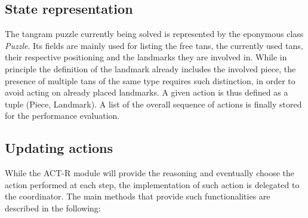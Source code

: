 \documentclass[a4paper,singleside,12pt]{report} %
\begin{document}
    \subsection{State representation}
    The tangram puzzle currently being solved is represented by the eponymous class \textit{Puzzle}.
    Its fields are mainly used for listing the free tans, the currently used tans, their respective
    positioning and the landmarks they are involved in. While in principle the definition of the
    landmark already includes the involved piece, the presence of multiple tans of the same type
    requires such distinction, in order to avoid acting on already placed landmarks. A given action
    is thus defined as a tuple (Piece, Landmark). A list of the overall sequence of actions is
    finally stored for the performance evaluation.
    \subsection{Updating actions}
    While the ACT-R module will provide the reasoning and eventually choose the action performed at
    each step, the implementation of such action is delegated to the coordinator. The main methods
    that provide such functionalities are described in the following:
\end{document}
